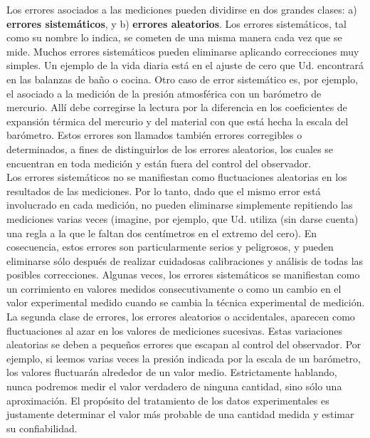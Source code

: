 Los errores asociados a las mediciones pueden dividirse en dos grandes clases: a) \textbf{errores sistemáticos}, y b) 
\textbf{errores aleatorios}. Los errores sistemáticos, tal como su nombre lo indica, se cometen de una misma manera cada vez que 
se mide. Muchos errores sistemáticos pueden eliminarse aplicando correcciones muy simples. Un ejemplo de la vida diaria está en 
el ajuste de cero que Ud. encontrará en las balanzas de baño o cocina. Otro caso de error sistemático es, por ejemplo, el asociado 
a la medición de la presión atmosférica con un barómetro de mercurio. Allí debe corregirse la lectura por la diferencia en los 
coeficientes de expansión térmica del mercurio y del material con que está hecha la escala del barómetro. Estos errores son 
llamados también errores corregibles o determinados, a fines de distinguirlos de los errores aleatorios, los cuales se encuentran 
en toda medición y están fuera del control del observador.\\ 

Los errores sistemáticos no se manifiestan como fluctuaciones aleatorias en los resultados de las mediciones. Por lo tanto, dado 
que el mismo error está involucrado en cada medición, no pueden eliminarse simplemente repitiendo las mediciones varias veces 
(imagine, por ejemplo, que Ud. utiliza (sin darse cuenta) una regla a la que le faltan dos centímetros en el extremo del cero). 
En cosecuencia, estos errores son particularmente serios y peligrosos, y pueden eliminarse sólo después de realizar cuidadosas 
calibraciones y análisis de todas las posibles correcciones. Algunas veces, los errores sistemáticos se manifiestan como un 
corrimiento en valores medidos consecutivamente o como un cambio en el valor experimental medido cuando se cambia la técnica 
experimental de medición.\\

La segunda clase de errores, los errores aleatorios o accidentales, aparecen como fluctuaciones al azar en los valores de 
mediciones sucesivas. Estas variaciones aleatorias se deben a pequeños errores que escapan al control del observador. Por ejemplo, 
si leemos varias veces la presión indicada por la escala de un barómetro, los valores fluctuarán alrededor de un valor medio. 
Estrictamente hablando, nunca podremos medir el valor verdadero de ninguna cantidad, sino sólo una aproximación. El propósito del 
tratamiento de los datos experimentales es justamente determinar el valor más probable de una cantidad medida y estimar su 
confiabilidad.

